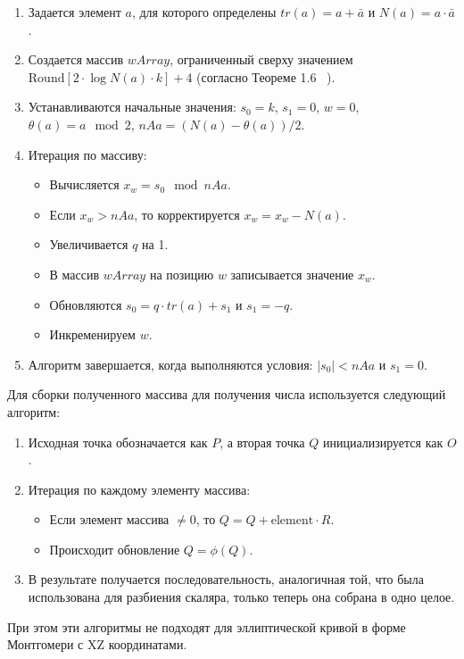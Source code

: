 \begin{enumerate}
    \item Задается элемент $a$, для которого определены $tr(a) = a + \bar{a}$ и $N(a) = a \cdot \bar{a}$.
    \item Создается массив $wArray$, ограниченный сверху значением $\text{Round}[2 \cdot \log N(a) \cdot k] + 4$ (согласно Теореме 1.6 ~\cite{nesterenko-disser}).
    \item Устанавливаются начальные значения: $s_0 = k$, $s_1 = 0$, $w = 0$, $\theta(a) = a \mod 2$, $nAa = (N(a) - \theta(a)) / 2$.
    \item Итерация по массиву:
    \begin{itemize}
        \item Вычисляется $x_w = s_0 \mod nAa$.
        \item Если $x_w > nAa$, то корректируется $x_w = x_w - N(a)$.
        \item Увеличивается $q$ на 1.
        \item В массив $wArray$ на позицию $w$ записывается значение $x_w$.
        \item Обновляются $s_0 = q \cdot tr(a) + s_1$ и $s_1 = -q$.
        \item Инкременируем $w$.
    \end{itemize}
\item Алгоритм завершается, когда выполняются условия: $|s_0| < nAa$ и $s_1 = 0$.
\end{enumerate}



Для сборки полученного массива для получения числа используется следующий алгоритм:

\begin{enumerate}
\item Исходная точка обозначается как $P$, а вторая точка $Q$ инициализируется как $O$.
\item Итерация по каждому элементу массива:
\begin{itemize}
\item Если элемент массива $\neq 0$, то $Q = Q + \text{element} \cdot R$.
\item Происходит обновление $Q = \phi(Q)$.
\end{itemize}
\item В результате получается последовательность, аналогичная той, что была использована для разбиения скаляра, только теперь она собрана в одно целое.
\end{enumerate}

При этом эти алгоритмы не подходят для эллиптической кривой в форме Монтгомери с XZ координатами.


